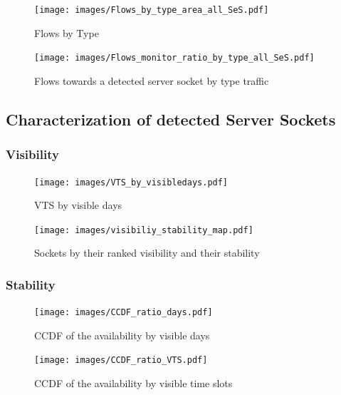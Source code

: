 \begin{figure}
	[ht] \centering 
	\texttt{[image: images/Flows\_by\_type\_area\_all\_SeS.pdf]}
	\caption{Flows by Type} 
	\label{fig:flows_by_type} 
\end{figure}


\begin{figure}
	[ht] \centering 
	\texttt{[image: images/Flows\_monitor\_ratio\_by\_type\_all\_SeS.pdf]}
	\caption{Flows towards a detected server socket by type traffic} 
	\label{fig:monitored_flows_by_type} 
\end{figure}


\subsection{Characterization of detected Server Sockets}

\subsubsection{Visibility}
\begin{figure}
	[ht] \centering 
	\texttt{[image: images/VTS\_by\_visibledays.pdf]}
	\caption{VTS by visible days} 
	\label{fig:vts_by_visibledays} 
\end{figure}

\begin{figure}
	[ht] \centering 
	\texttt{[image: images/visibiliy\_stability\_map.pdf]}
	\caption{Sockets by their ranked visibility and their stability} 
	\label{fig:rankedVisibility} 
\end{figure}

\subsubsection{Stability}

\begin{landscape}
\begin{figure}
	[ht] \centering 
	\texttt{[image: images/CCDF\_ratio\_days.pdf]}
	\caption{CCDF of the availability by visible days} 
	\label{fig:ccdf_ratio_days} 
\end{figure}
\end{landscape}

\begin{landscape}
\begin{figure}
	[ht] \centering 
	\texttt{[image: images/CCDF\_ratio\_VTS.pdf]}
	\caption{CCDF of the availability by visible time slots} 
	\label{fig:ccdf_ratio_vts} 
\end{figure}
\end{landscape}

